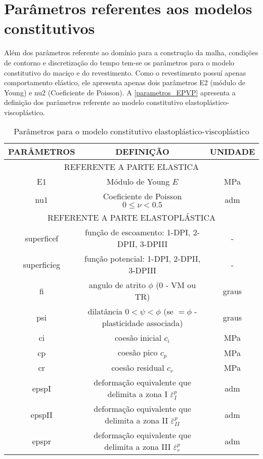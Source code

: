 \section{Parâmetros referentes aos modelos constitutivos}
Além dos parâmetros referente ao domínio para a construção da malha, condições de contorno e discretização do tempo tem-se os parâmetros para o modelo constitutivo do maciço e do revestimento. Como o revestimento possuí apenas comportamento elástico, ele apresenta apenas dois parâmetros E2 (módulo de Young) e nu2 (Coeficiente de Poisson). A \autoref{parametros_EPVP} apresenta a definição dos parâmetros referente ao modelo constitutivo elastoplástico-viscoplástico.
\begin{table}[H]
	\caption{Parâmetros para o modelo constitutivo elastoplástico-viscoplástico}
	\label{parametros_EPVP}
	\centering
	\small
	\renewcommand{\arraystretch}{1.25}
	\begin{tabular}{c c c}
		\hline
		\multicolumn{1}{c}{\textbf{PARÂMETROS}} &
		\multicolumn{1}{c}{\textbf{DEFINIÇÃO}} &
		\multicolumn{1}{c}{\textbf{UNIDADE}} \\
		\hline
		\multicolumn{3}{c}{REFERENTE A PARTE ELASTICA} \\
		\hline
		E1 & Módulo de Young $E$  & MPa \\			
		nu1 & Coeficiente de Poisson $0 \leq \nu<0.5$  & adm \\		
		\hline
		\multicolumn{3}{c}{REFERENTE A PARTE ELASTOPLÁSTICA} \\
		\hline
		superficef & função de escoamento: 1-DPI, 2-DPII, 3-DPIII  & - \\		
		superficieg & função potencial: 1-DPI, 2-DPII, 3-DPIII & - \\
		fi & angulo de atrito $\phi$ (0 - VM ou TR) & graus \\		
		psi & dilatância $0<\psi<\phi$ (se $=\phi$ - plasticidade associada) & graus \\	
		ci & coesão inicial $c_i$ & MPa \\
		cp & coesão pico $c_p$ & MPa \\
		cr & coesão residual $c_r$ & MPa \\ 
		epspI & deformação equivalente que delimita a zona I $\bar \varepsilon^p_{I}$ & adm \\
		epspII & deformação equivalente que delimita a zona II $\bar \varepsilon^p_{II}$ & adm \\
		epspr & deformação equivalente que delimita a zona III $\bar \varepsilon^p_{r}$ & adm \\	

\end{tabular}
\end{table}
